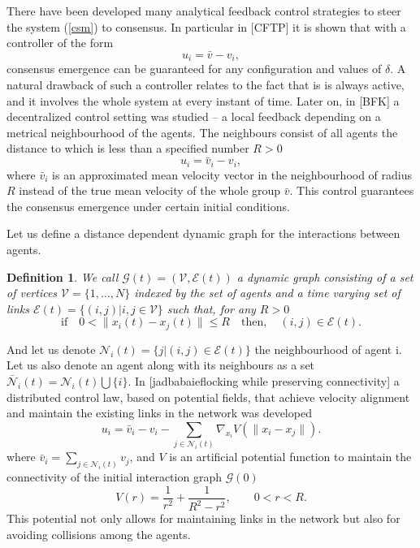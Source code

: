 \documentclass[a4paper,10pt, english]{article}
\newtheorem{dfn}{Definition}[section]
\begin{document}
There have been developed many analytical feedback control strategies  to steer the system (\ref{csm}) to consensus. In particular in [CFTP] it is shown that with a controller 
of the form
$$
u_i = \bar{v} - v_i,
$$
consensus emergence can be guaranteed for any configuration and values of $\delta$. A natural drawback of such a controller relates to the fact that is is always active, and it involves the whole system at every
instant of time. Later on,  in [BFK] a decentralized control setting  was studied \--- a local feedback depending on a metrical neighbourhood of the agents. The neighbours consist of all agents 
the distance to which is less than a specified number $R>0$
$$
u_i = \bar{v}_i - v_i,
$$
where $\bar{v}_i$ is an approximated mean velocity vector in the neighbourhood of radius $R$ instead of the true mean velocity of the whole group $\bar{v}$. This control guarantees the consensus emergence under certain initial conditions.




Let us define a distance dependent dynamic graph for the interactions between agents.
\begin{dfn}
We call $\mathcal{G}(t) =  (\mathcal{V}, \mathcal{E}(t) )$ a dynamic graph consisting of a set of vertices $\mathcal{V} = \{1, \dots,  N\}$ indexed by the set of agents and a time varying set of links 
$\mathcal{E}(t) = \{(i, j)|i, j \in \mathcal{V}\}$ such that, for any $R>0$
$$
\mbox{if}\quad 0<\|x_i(t) - x_j(t)\| \leq R \quad\mbox{then},\quad (i, j)\in \mathcal{E}(t).
$$
\end{dfn}
And let us denote $\mathcal{N}_i(t) = \{j|(i, j)\in\mathcal{E}(t)\}$ the neighbourhood of agent i.
Let us also denote an agent along with its neighbours as a set $\bar{\mathcal{N}}_i(t) = \mathcal{N}_i(t)\bigcup \{i\}$.
In [jadbabaieflocking while preserving connectivity] a distributed control law, based on potential fields, that achieve velocity alignment and maintain the existing links in the network was developed 
\begin{equation}
u_i = \bar{v}_i - v_i - \sum_{j \in \mathcal{N}_i(t)}\nabla_{x_i}V(\|x_i - x_j\|).
\label{controljad}
\end{equation}
where $\bar{v}_i = \sum_{j \in \mathcal{N}_i(t)} v_j$, and $V$ is an artificial potential function  to maintain the connectivity of the initial interaction graph $\mathcal{G}(0)$ 
\begin{equation}
 V(r) = \frac{1}{r^2} + \frac{1}{R^2 - r^2}, \qquad 0 < r < R.
\label{potential}
\end{equation}
This potential not only allows for maintaining links in the network but also for avoiding collisions among the agents. 
\end{document}
